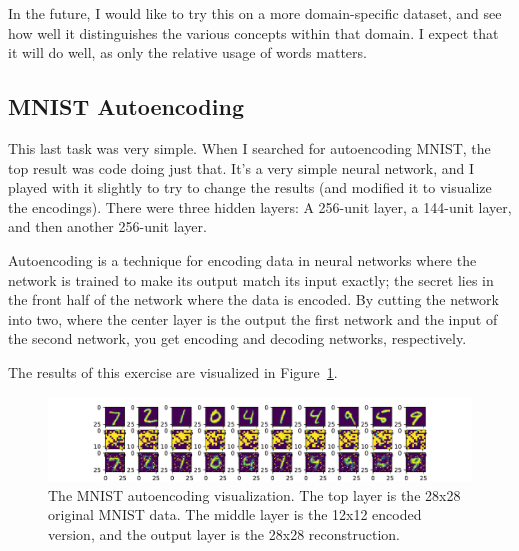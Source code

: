 \documentclass{journal}
\begin{document}
In the future, I would like to try this on a more domain-specific dataset, and
see how well it distinguishes the various concepts within that domain. I expect
that it will do well, as only the relative usage of words matters.

\subsection{MNIST Autoencoding}
This last task was very simple. When I searched for autoencoding MNIST, the top
result was code doing just that. It's a very simple neural network, and I played
with it slightly to try to change the results (and modified it to visualize the
encodings). There were three hidden layers: A 256-unit layer, a 144-unit layer,
and then another 256-unit layer.

Autoencoding is a technique for encoding data in neural networks where the
network is trained to make its output match its input exactly; the secret lies
in the front half of the network where the data is encoded. By cutting the
network into two, where the center layer is the output the first network and
the input of the second network, you get encoding and decoding networks,
respectively.

The results of this exercise are visualized in Figure~\ref{fig:autoencoding}.

\begin{figure}[h]
    \includegraphics[width=\textwidth]{MNIST_Autoencoding}
    \caption{The MNIST autoencoding visualization. The top layer is the 28x28
             original MNIST data. The middle layer is the 12x12 encoded version,
             and the output layer is the 28x28
             reconstruction.}\label{fig:autoencoding}
\end{figure}
\end{document}
